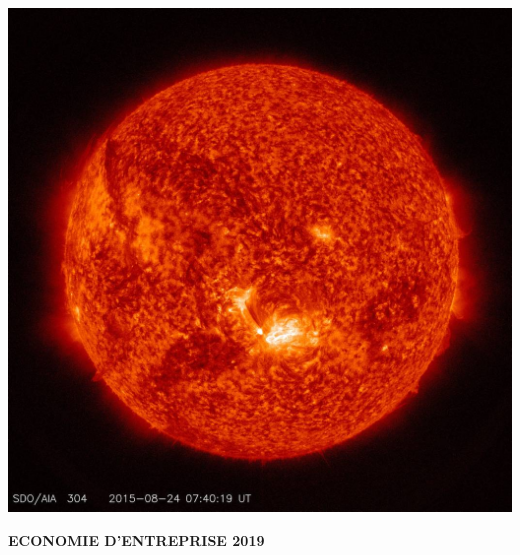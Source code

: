 
\begin{titlepage}
	\parindent=0pt
 
\addtolength{\wpXoffset}{-4.5cm}

	\begin{center}
		\includegraphics[scale=0.5]{images/sol}%
	\end{center}
	
	\hrulefill
	\begin{center}\bfseries\Huge
		\color{black}
		{ECONOMIE D'ENTREPRISE 2019 } 
	\end{center}
	\hrulefill
	
	\vspace*{1cm}
	\begin{center}\bfseries\Large
			\color{white}
			{}
		
	\end{center}
	


\end{titlepage}
